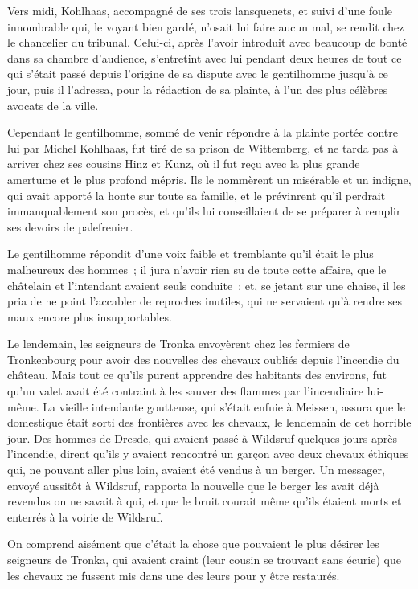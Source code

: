 \documentclass[french,twoside]{book} %
\begin{document}
Vers midi, Kohlhaas, accompagné de ses trois lansquenets, et suivi d’une foule innombrable qui, le voyant bien gardé, n’osait lui faire aucun mal, se rendit chez le chancelier du tribunal. Celui-ci, après l’avoir introduit avec beaucoup de bonté dans sa chambre d’audience, s’entretint avec lui pendant deux heures de tout ce qui s’était passé depuis l’origine de sa dispute avec le gentilhomme jusqu’à ce jour, puis il l’adressa, pour la rédaction de sa plainte, à l’un des plus célèbres avocats de la ville.\par
Cependant le gentilhomme, sommé de venir répondre à la plainte portée contre lui par Michel Kohlhaas, fut tiré de sa prison de Wittemberg, et ne tarda pas à arriver chez ses cousins Hinz et Kunz, où il fut reçu avec la plus grande amertume et le plus profond mépris. Ils le nommèrent un misérable et un indigne, qui avait apporté la honte sur toute sa famille, et le prévinrent qu’il perdrait immanquablement son procès, et qu’ils lui conseillaient de se préparer à remplir ses devoirs de palefrenier.\par
Le gentilhomme répondit d’une voix faible et tremblante qu’il était le plus malheureux des hommes ; il jura n’avoir rien su de toute cette affaire, que le châtelain et l’intendant avaient seuls conduite ; et, se jetant sur une chaise, il les pria de ne point l’accabler de reproches inutiles, qui ne servaient qu’à rendre ses maux encore plus insupportables.\par
Le lendemain, les seigneurs de Tronka envoyèrent chez les fermiers de Tronkenbourg pour avoir des nouvelles des chevaux oubliés depuis l’incendie du château. Mais tout ce qu’ils purent apprendre des habitants des environs, fut qu’un valet avait été contraint à les sauver des flammes par l’incendiaire lui-même. La vieille intendante goutteuse, qui s’était enfuie à Meissen, assura que le domestique était sorti des frontières avec les chevaux, le lendemain de cet horrible jour. Des hommes de Dresde, qui avaient passé à Wildsruf quelques jours après l’incendie, dirent qu’ils y avaient rencontré un garçon avec deux chevaux éthiques qui, ne pouvant aller plus loin, avaient été vendus à un berger. Un messager, envoyé aussitôt à Wildsruf, rapporta la nouvelle que le berger les avait déjà revendus on ne savait à qui, et que le bruit courait même qu’ils étaient morts et enterrés à la voirie de Wildsruf.\par
On comprend aisément que c’était la chose que pouvaient le plus désirer les seigneurs de Tronka, qui avaient craint (leur cousin se trouvant sans écurie) que les chevaux ne fussent mis dans une des leurs pour y être restaurés.\par
\end{document}
